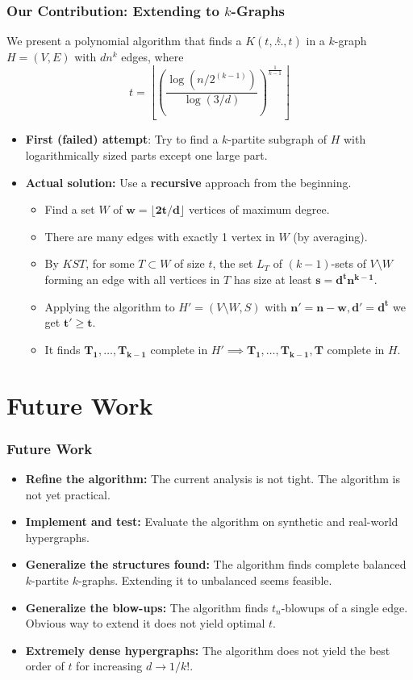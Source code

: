 \documentclass[aspectratio=169]{beamer}
\newcommand{\compoverset}[2]{\ensuremath{K\left(#2, \overset{#1}{\dots}, #2\right)}} %
\theoremstyle{mystyle}
\begin{document}
\begin{frame}
    \frametitle{Our Contribution: Extending to $k$-Graphs}
    We present a polynomial algorithm that finds a $\compoverset{k}{t}$ in a $k$-graph $H = (V, E)$ with $d n^k$ edges, where
    \[
        t = \left\lfloor \left(  \frac{\log \left(n/2^{(k-1)}\right)}{\log (3/d)} \right)^{\frac{1}{k-1}} \right\rfloor
    \]
    \begin{itemize}
        \item<1->\textbf{First (failed) attempt}: Try to find a $k$-partite subgraph of $H$ with logarithmically sized parts except one large part.
        \item<2->\textbf{Actual solution:} Use a \textbf{recursive} approach from the beginning.
        \begin{itemize}
            \item<3-> Find a set $W$ of $\mathbf{w = \lfloor 2t / d \rfloor}$ vertices of maximum degree.
            \item<4-> There are many edges with exactly 1 vertex in $W$ (by averaging).
            \item<5-> By $KST$, for some $T \subset W$ of size $t$, the set $L_T$ of $(k-1)$-sets of $V \setminus W$
            forming an edge with all vertices in $T$ has size at least $\mathbf{s = d^t n^{k-1}}$.
            \item<6-> Applying the algorithm to $H' = (V \setminus W, S)$ with $\mathbf{n' = n-w, d' = d^t}$
            we get $\mathbf{t' \geq t}$.
            \item<7-> It finds $\mathbf{T_1, \dots, T_{k-1}}$ complete in $H' \implies \mathbf{T_1, \dots, T_{k-1}, T}$ complete in $H$.
        \end{itemize}
    \end{itemize}
\end{frame}
    
\section{Future Work}\label{sec:future-work}

\begin{frame}
    \frametitle{Future Work}
    \begin{itemize}
        \item<2-> \textbf{Refine the algorithm:} The current analysis is not tight.
        The algorithm is not yet practical.
        \item<3-> \textbf{Implement and test:} Evaluate the algorithm on synthetic and real-world hypergraphs.
        \item<4-> \textbf{Generalize the structures found:} The algorithm finds complete balanced $k$-partite $k$-graphs.
        Extending it to unbalanced seems feasible.
        \item<5-> \textbf{Generalize the blow-ups:} The algorithm finds $t_n$-blowups of a single edge.
        Obvious way to extend it does not yield optimal $t$.
        \item<6-> \textbf{Extremely dense hypergraphs:} The algorithm does not yield the best order of $t$ for increasing $d \to 1/k!$.
    \end{itemize}
\end{frame}
\end{document}

